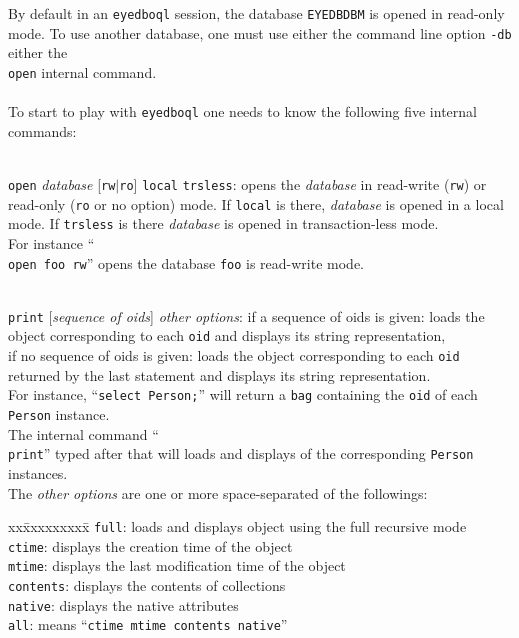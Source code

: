 By default in an \texttt{eyedboql} session, the database \texttt{EYEDBDBM} is opened in
read-only mode. To use another database, one must use either the command line
option \texttt{-db} either the \texttt{\\open} internal command.\\
\\
To start to play with \texttt{eyedboql} one needs to know the following
five internal commands:
\be
\item \texttt{\\open} \emph{database} [\texttt{rw}$|$\texttt{ro}] \texttt{local} \texttt{trsless}:
opens the \emph{database} in read-write (\texttt{rw}) or
read-only (\texttt{ro} or no option) mode. If \texttt{local} is there,
\emph{database} is opened in a local mode. If \texttt{trsless} is
there \emph{database} is opened in transaction-less mode.\\
For instance ``\texttt{\\open foo rw}'' opens the database \texttt{foo} is
read-write mode.
\item \texttt{\\print} [\emph{sequence of oids}] \emph{other options}: 	
if a sequence of oids is given: loads the object corresponding to each \texttt{oid}
and displays its string representation,\\
if no sequence of oids is given: loads the object corresponding to each \texttt{oid}
returned by the last statement and displays its string representation.\\
For instance, ``\texttt{select Person;}'' will return a \texttt{bag} containing
the \texttt{oid} of each \texttt{Person} instance.\\
The internal command ``\texttt{\\print}'' typed after that will loads and
displays of the corresponding \texttt{Person} instances.\\
The \emph{other options} are one or more space-separated of the followings:
\begin{tabbing}
xx\=xxxxxxxxx\=\kill
\>\texttt{full}\>: loads and displays object using the full recursive mode\\
\>\texttt{ctime}\>: displays the creation time of the object\\
\>\texttt{mtime}\>: displays the last modification time of the object\\
\>\texttt{contents}\>:  displays the contents of collections\\
\>\texttt{native}\>:  displays the native attributes\\
\>\texttt{all}\>: means ``\texttt{ctime mtime contents native}''
\end{tabbing}
